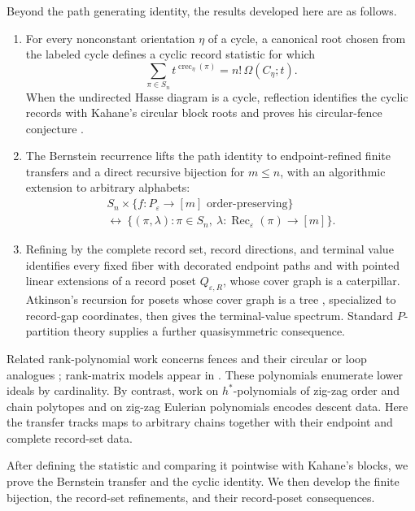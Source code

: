 \documentclass[11pt,letterpaper,reqno]{amsart}
\theoremstyle{definition}
\newcommand{\eps}{\varepsilon}
\begin{document}
Beyond the path generating identity, the results developed here are as
follows.
\begin{enumerate}[label=(\roman*)]
\item For every nonconstant orientation \(\eta\) of a cycle, a canonical root
chosen from the labeled cycle defines a cyclic record statistic for which
\[
\sum_{\pi\in S_n}t^{\operatorname{crec}_\eta(\pi)}
=n!\,\Omega(C_\eta;t).
\]
When the undirected Hasse diagram is a cycle, reflection identifies the cyclic
records with Kahane's circular block roots and proves his circular-fence
conjecture \cite[Conjecture~4.8]{Kahane}.
\item The Bernstein recurrence lifts the path identity to endpoint-refined
finite transfers and a direct recursive bijection for \(m\le n\), with an
algorithmic extension to arbitrary alphabets:
\begin{multline*}
S_n\times\{f:P_\eps\to[m]\text{ order-preserving}\}
\\[-2pt]
\longleftrightarrow\ 
\{(\pi,\lambda):\pi\in S_n,\ 
  \lambda:\operatorname{Rec}_\eps(\pi)\to[m]\}.
\end{multline*}
\item Refining by the complete record set, record directions, and terminal
value identifies every fixed fiber with decorated endpoint paths and with
pointed linear extensions of a record poset \(Q_{\eps,R}\), whose cover graph
is a caterpillar.  Atkinson's recursion for posets whose cover graph is a tree
\cite{AtkinsonTree}, specialized to record-gap coordinates, then gives the
terminal-value spectrum.  Standard \(P\)-partition theory supplies a further
quasisymmetric consequence.
\end{enumerate}

Related rank-polynomial work concerns fences \cite{MGO,KOR} and their circular
or loop analogues \cite{Chainlink,KLL}; rank-matrix models appear in
\cite{KantarciOguz}.  These polynomials enumerate lower ideals by cardinality.
By contrast, work on \(h^\ast\)-polynomials of zig-zag order and chain
polytopes \cite{CZ,CS} and on zig-zag Eulerian polynomials \cite{PZ} encodes
descent data.  Here the transfer tracks maps to arbitrary chains together with
their endpoint and complete record-set data.

After defining the statistic and comparing it pointwise with Kahane's blocks,
we prove the Bernstein transfer and the cyclic identity.  We then develop the
finite bijection, the record-set refinements, and their record-poset
consequences.
\end{document}
